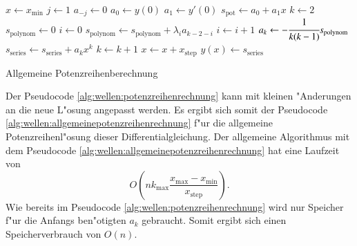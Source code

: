 \begin{algorithm}
	\begin{algorithmic}[1]
		\State $x \gets x_{\text{min}}$
			\State $j \gets 1$
				\State $a_{-j} \gets 0$
			\EndFor
			\State $a_0 \gets y(0)$
			\State $a_1 \gets y'(0)$
			\State $s_{\text{pot}} \gets a_0 + a_1x$
			\State $k \gets 2$
				\State $s_{\text{polynom}} \gets 0$
				\State $i \gets 0$
					\State $s_{\text{polynom}} \gets 
					s_{\text{polynom}}+\lambda_i a_{k-2-i}$
					\State $i \gets i + 1$
				\EndFor
				\State $a_k \gets -\cfrac{1}{k(k-1)} s_{\text{polynom}}$
				\State $s_{\text{series}} \gets s_{\text{series}} + 
				a_k x^k$
				\State $k \gets k + 1$
			\EndFor
		\State $x \gets x + x_{\text{step}}$
		\State $y(x) \gets s_{\text{series}}$
		\EndFor
	\end{algorithmic}
	
	\caption{Allgemeine Potenzreihenberechnung} 
	\label{alg:wellen:allgemeinepotenzreihenrechnung}
\end{algorithm}

Der Pseudocode \ref{alg:wellen:potenzreihenrechnung} kann mit kleinen 
"Anderungen an die neue L"osung angepasst werden. Es ergibt sich somit der 
Pseudocode \ref{alg:wellen:allgemeinepotenzreihenrechnung} f"ur die allgemeine 
Potenzreihenl"osung dieser Differentialgleichung. Der allgemeine Algorithmus 
mit dem Pseudocode \ref{alg:wellen:allgemeinepotenzreihenrechnung} hat eine 
Laufzeit von
\begin{equation*}
	O
	\left(
		nk_{\text{max}}\frac{x_{\text{max}}-x_{\text{min}}}{x_{\text{step}}}
	\right).
\end{equation*}
Wie bereits im Pseudocode \ref{alg:wellen:potenzreihenrechnung} wird nur 
Speicher f"ur die Anfangs ben"otigten $a_k$ gebraucht. Somit ergibt sich einen 
Speicherverbrauch von $O(n)$.

